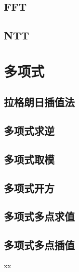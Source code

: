 \subsection{FFT}

\subsection{NTT}

\section{多项式}

\subsection{拉格朗日插值法}

\subsection{多项式求逆}

\subsection{多项式取模}

\subsection{多项式开方}

\subsection{多项式多点求值}

\subsection{多项式多点插值}



\begin{problemset}
	\item xx
\end{problemset}


\nocite{*} 

